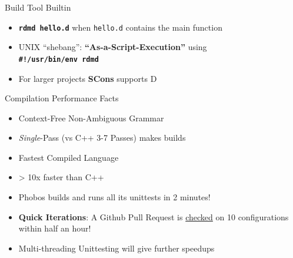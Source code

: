 \documentclass[xcolor=dvipsnames]{beamer}
\begin{document}
\begin{frame}[fragile]{Build Tool Builtin}
  \begin{itemize}[<+->]
  \item \textbf{\texttt{rdmd hello.d}} when \texttt{hello.d} contains the
    main function
  \item UNIX ``shebang'': \textbf{“As-a-Script-Execution”} using
    \\
    \textbf{\textbf{\texttt{\#!/usr/bin/env rdmd}}}
  \item For larger projects \textbf{SCons} supports D
  \end{itemize}
\end{frame}

\begin{frame}[fragile]{Compilation Performance Facts}
  \begin{itemize}[<+->]
  \item Context-Free Non-Ambiguous Grammar
  \item \emph{Single}-Pass (vs C++ 3-7 Passes) makes builds
  \item Fastest Compiled Language
  \item > 10x faster than C++
  \item Phobos builds and runs all its unittests in 2 minutes!
  \item \textbf{Quick Iterations}: A Github Pull Request is
    \href{https://d.puremagic.com/test-results/pull-history.ghtml?projectid=1&repoid=1&pullid=3342}{checked}
    on 10 configurations within half an hour!
  \item Multi-threading Unittesting will give further speedups
  \end{itemize}
\end{frame}
\end{document}
